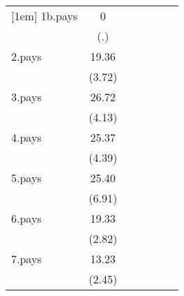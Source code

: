 {\begin{tabular}{l*{6}{c}}
[1em]
1b.pays             &           0         &                     &                     &                     &                     &                     \\
                    &         (.)         &                     &                     &                     &                     &                     \\
[1em]
2.pays              &       19.36\sym{***}&                     &                     &                     &                     &                     \\
                    &      (3.72)         &                     &                     &                     &                     &                     \\
[1em]
3.pays              &       26.72\sym{***}&                     &                     &                     &                     &                     \\
                    &      (4.13)         &                     &                     &                     &                     &                     \\
[1em]
4.pays              &       25.37\sym{***}&                     &                     &                     &                     &                     \\
                    &      (4.39)         &                     &                     &                     &                     &                     \\
[1em]
5.pays              &       25.40\sym{***}&                     &                     &                     &                     &                     \\
                    &      (6.91)         &                     &                     &                     &                     &                     \\
[1em]
6.pays              &       19.33\sym{**} &                     &                     &                     &                     &                     \\
                    &      (2.82)         &                     &                     &                     &                     &                     \\
[1em]
7.pays              &       13.23\sym{*}  &                     &                     &                     &                     &                     \\
                    &      (2.45)         &                     &                     &                     &                     &                     \\

\end{tabular}}
